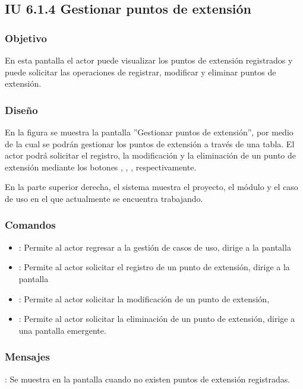 \subsection{IU 6.1.4 Gestionar puntos de extensión}

\subsubsection{Objetivo}
	En esta pantalla el actor puede visualizar los puntos de extensión registrados y puede solicitar las operaciones de registrar, modificar y eliminar puntos de extensión.
\subsubsection{Diseño}
	En la figura  se muestra la pantalla ''Gestionar puntos de extensión'', por medio de la cual se podrán gestionar los puntos de extensión a través de una tabla. El actor podrá solicitar el registro, la modificación y la eliminación de un punto de extensión mediante los botones , \editar, \eliminar, respectivamente.
	
	En la parte superior derecha, el sistema muestra el proyecto, el módulo y el caso de uso en el que actualmente se encuentra trabajando.

\subsubsection{Comandos}
\begin{itemize}
	\item {}: Permite al actor regresar a la gestión de casos de uso, dirige a la pantalla 
	\item {}: Permite al actor solicitar el registro de un punto de extensión, dirige a la pantalla 
	\item \editar [Modificar]: Permite al actor solicitar la modificación de un punto de extensión, 
	\item \eliminar [Eliminar]: Permite al actor solicitar la eliminación de un punto de extensión, dirige a una pantalla emergente.
\end{itemize}

\subsubsection{Mensajes}

\begin{Citemize}
	\item {}: Se muestra en la pantalla  cuando no existen puntos de extensión registradas.
\end{Citemize}
